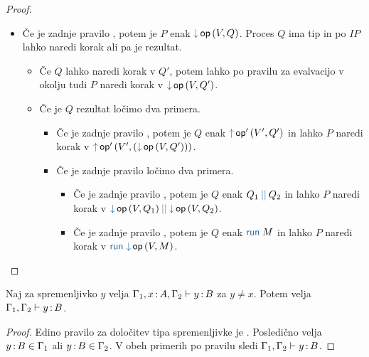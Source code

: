 \begin{proof}
\begin{itemize}
		\item Če je zadnje pravilo , potem je $P$ enak $\tmopin{op}{V}{Q}$. Proces $Q$ ima tip in po $IP$ lahko naredi korak ali pa je rezultat.
		\begin{itemize}
			\item Če $Q$ lahko naredi korak v $Q'$, potem lahko po pravilu za evalvacijo v okolju tudi $P$ naredi korak v $\tmopin{op}{V}{Q'}$.
			\item Če je $Q$ rezultat ločimo dva primera.
			\begin{itemize}
				
				\item Če je zadnje pravilo , potem je $Q$ enak $\tmopout{op'}{V'}{Q'}$ in lahko $P$ naredi korak v $\tmopout{op'}{V'}{(\tmopin{op}{V}{Q'})}$.
				
				\item Če je zadnje pravilo  ločimo dva primera.
				\begin{itemize}
					\item Če je zadnje pravilo , potem je $Q$ enak $\tmpar{Q_1}{Q_2}$ in lahko $P$ naredi korak v $\tmpar{\tmopin{op}{V}{Q_1}}{\tmopin{op}{V}{Q_2}}$.
					\item Če je zadnje pravilo , potem je $Q$ enak $\tmrun{M}$ in lahko $P$ naredi korak v $\tmrun{\tmopin{op}{V}{M}}$.
				\end{itemize}
				
			\end{itemize}
		
		\end{itemize}
		
	\end{itemize}
		
\end{proof}


\begin{lema}\label{lem:strengthening-gamma}
	Naj za spremenljivko $y$ velja $\Gamma_1, x \mathinner{:} A, \Gamma_2 \vdash y \mathinner{:} B$ za $y \neq x$. Potem velja $\Gamma_1, \Gamma_2 \vdash y \mathinner{:} B$.
\end{lema}

\begin{proof}
	Edino pravilo za določitev tipa spremenljivke je . Posledično velja $y \mathinner{:} B \in \Gamma_1$ ali $y \mathinner{:} B \in \Gamma_2$. V obeh primerih po pravilu  sledi $\Gamma_1, \Gamma_2 \vdash y \mathinner{:} B$.
\end{proof}

